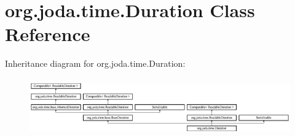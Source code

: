 \hypertarget{classorg_1_1joda_1_1time_1_1_duration}{\section{org.\-joda.\-time.\-Duration Class Reference}
\label{classorg_1_1joda_1_1time_1_1_duration}
}
Inheritance diagram for org.\-joda.\-time.\-Duration\-:\begin{figure}[H]
\begin{center}
\leavevmode
\includegraphics[height=2.511211cm]{classorg_1_1joda_1_1time_1_1_duration}
\end{center}
\end{figure}
